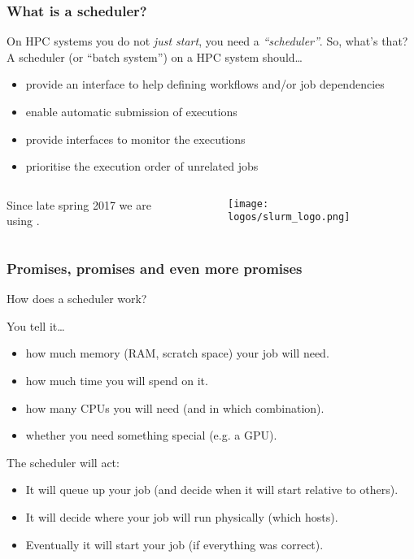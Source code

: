\begin{frame}
  \frametitle{What is a scheduler?}
  On HPC systems you do not \emph{just start}, you need a \emph{``scheduler''}.
  So, what's that?\newline
  A scheduler (or ``batch system'') on a HPC system should\ldots
  \begin{itemize}
  \item provide an interface to help defining workflows and/or job dependencies
  \item enable automatic submission of executions
  \item provide interfaces to monitor the executions
  \item prioritise the execution order of unrelated jobs
  \end{itemize}
  \begin{columns}
    \begin{column}{0.8\linewidth}
      Since late spring 2017 we are using \slurm.
    \end{column}
    \begin{column}{0.2\linewidth}
      \begin{figure}
        \centering
        \texttt{[image: logos/slurm\_logo.png]}
      \end{figure}
    \end{column}
  \end{columns}
  \vfill
\end{frame}

\begin{frame}
  \frametitle{Promises, promises and even more promises}
  How does a scheduler work?
  \pause
  \begin{block}{You tell it\ldots}
    \begin{itemize}
    \item how much memory (RAM, scratch space) your job will need.\pause
    \item how much time you will spend on it.\pause
    \item how many CPUs you will need (and in which combination).\pause
    \item whether you need something special (e.g. a GPU).
    \end{itemize}
  \end{block}
  \pause \vspace{-0.2cm}
  \begin{exampleblock}{The scheduler will act:}
    \begin{itemize}
    \item It will queue up your job (and decide when it will start relative to others).\pause
    \item It will decide where your job will run physically (which hosts).\pause
    \item Eventually it will start your job (if everything was correct).
    \end{itemize}
  \end{exampleblock}
  \vfill
\end{frame}

